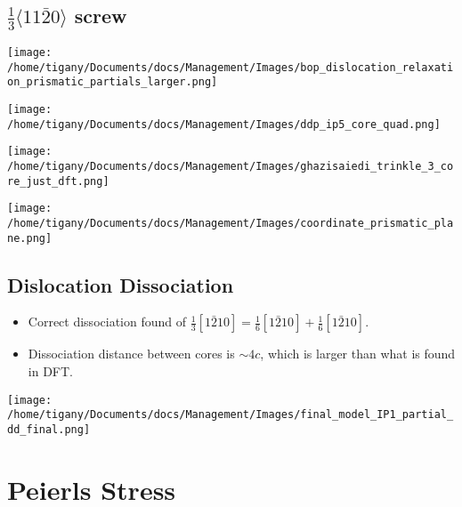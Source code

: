 \documentclass[11pt]{article}
\begin{document}
\subsection*{\(\frac{1}{3}\langle11\bar{2}0\rangle\) screw}
\label{sec:org4516c51}
\begin{center}
\texttt{[image: /home/tigany/Documents/docs/Management/Images/bop\_dislocation\_relaxation\_prismatic\_partials\_larger.png]}
\end{center}

\begin{center}
\texttt{[image: /home/tigany/Documents/docs/Management/Images/ddp\_ip5\_core\_quad.png]}
\end{center}

\begin{center}
\texttt{[image: /home/tigany/Documents/docs/Management/Images/ghazisaiedi\_trinkle\_3\_core\_just\_dft.png]}
\end{center}

\begin{center}
\texttt{[image: /home/tigany/Documents/docs/Management/Images/coordinate\_prismatic\_plane.png]}
\end{center}


\subsection*{Dislocation Dissociation}
\label{sec:org7a1f3a0}

\begin{itemize}
\item Correct dissociation found of \(\frac{1}{3}[1\bar{2}10] =
     \frac{1}{6}[1\bar{2}10] + \frac{1}{6}[1\bar{2}10]\).
\item Dissociation distance between cores is \(\sim4c\), which is larger
than what is found in DFT.
\end{itemize}


\begin{center}
\texttt{[image: /home/tigany/Documents/docs/Management/Images/final\_model\_IP1\_partial\_dd\_final.png]}
\end{center}



\section*{Peierls Stress}
\label{sec:orgc590617}
\end{document}
